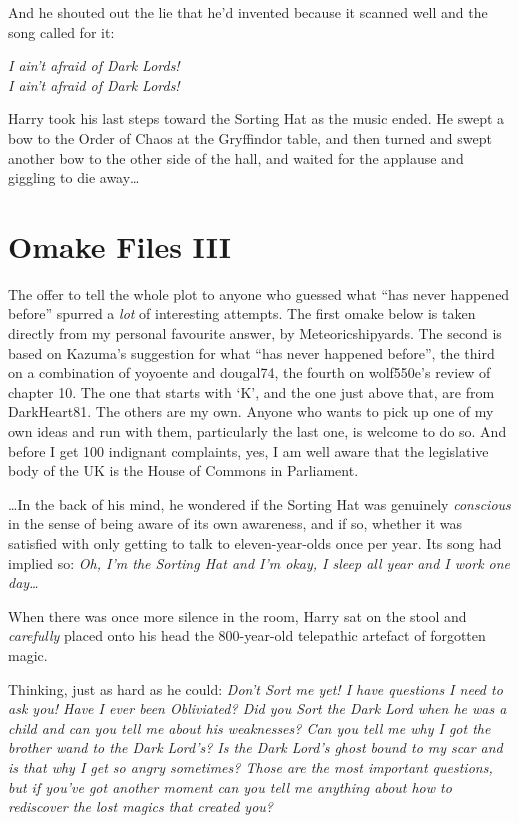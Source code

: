 And he shouted out the lie that he’d invented because it scanned well and the song called for it:

\begin{center}
\emph{I ain’t afraid of Dark Lords!\\
I ain’t afraid of Dark Lords!}
\end{center}

Harry took his last steps toward the Sorting Hat as the music ended. He swept a bow to the Order of Chaos at the Gryffindor table, and then turned and swept another bow to the other side of the hall, and waited for the applause and giggling to die away…

\section{Omake Files III}

The offer to tell the whole plot to anyone who guessed what “has never happened before” spurred a \emph{lot} of interesting attempts. The first omake below is taken directly from my personal favourite answer, by Meteoricshipyards. The second is based on Kazuma’s suggestion for what “has never happened before”, the third on a combination of yoyoente and dougal74, the fourth on wolf550e’s review of chapter 10. The one that starts with ‘K’, and the one just above that, are from DarkHeart81. The others are my own. Anyone who wants to pick up one of my own ideas and run with them, particularly the last one, is welcome to do so. And before I get 100 indignant complaints, yes, I am well aware that the legislative body of the UK is the House of Commons in Parliament.

\later

…In the back of his mind, he wondered if the Sorting Hat was genuinely \emph{conscious} in the sense of being aware of its own awareness, and if so, whether it was satisfied with only getting to talk to eleven-year-olds once per year. Its song had implied so: \emph{Oh, I’m the Sorting Hat and I’m okay, I sleep all year and I work one day…}

When there was once more silence in the room, Harry sat on the stool and \emph{carefully} placed onto his head the 800-year-old telepathic artefact of forgotten magic.

Thinking, just as hard as he could: \emph{Don’t Sort me yet! I have questions I need to ask you! Have I ever been Obliviated? Did you Sort the Dark Lord when he was a child and can you tell me about his weaknesses? Can you tell me why I got the brother wand to the Dark Lord’s? Is the Dark Lord’s ghost bound to my scar and is that why I get so angry sometimes? Those are the most important questions, but if you’ve got another moment can you tell me anything about how to rediscover the lost magics that created you?}

